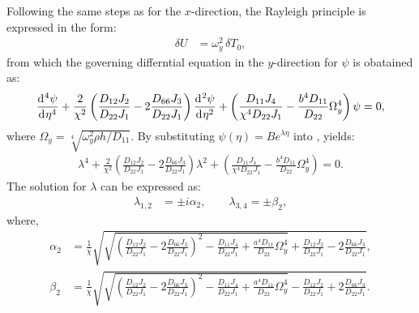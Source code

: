 \documentclass[preprint,12pt,number]{elsarticle}
\newcommand{\id}{\mathrm{d}\mkern1mu}
\begin{document}
Following the same steps as for the \(x\)-direction, the Rayleigh principle is expressed in the form:  
%
\begin{equation}\label{eq:Rayleighy}
	\begin{split}
		\delta U &= \omega_y^2 \, \delta T_0,
	\end{split}
\end{equation}
%
from which the governing differntial equation in the $y$-direction for $\psi$ is obatained as:
%
\begin{equation}\label{eq:ODEy}
	\frac{\id^4 \psi}{\id \eta^4} + \frac{2}{\chi^2}\left(\frac{D_{12}J_2}{D_{22}J_1} - 2\frac{D_{66}J_3}{D_{22}J_1}\right)\frac{\id^2 \psi}{\id \eta^2} + \left( \frac{D_{11}J_4}{\chi^4D_{22}J_1} - \frac{b^4D_{11}}{D_{22}} \Omega_y^4 \right) \psi = 0,
\end{equation}
%
where $\Omega_y = \sqrt[4]{{\omega_y^2 \rho h}/D_{11}}$.
By substituting $\psi(\eta) = B e^{\lambda \eta}$ into , yields:
%
\begin{equation}\label{eq:ODEy2}
\begin{split}
	\lambda^4 + \frac{2}{\chi^2} \left( \frac{D_{12}J_2}{D_{22}J_1} - 2\frac{D_{66}J_3}{D_{22}J_1} \right) \lambda^2 + \left( \frac{D_{11}J_4}{\chi^4D_{22}J_1} - \frac{b^4D_{11}}{D_{22}} \Omega_y^4 \right) = 0.
\end{split}
\end{equation}
%
The solution for $\lambda$ can be expressed as:
%
\begin{equation}\label{eq:lambda}
\begin{split}
	\lambda_{1,2} &= \pm \textit{i} \alpha_2, \qquad \lambda_{3,4} = \pm \beta_2,
\end{split}
\end{equation}
%
where,
%
\begin{subequations}\label{eq:beta}
\begin{align}
	\alpha_2 &= \frac{1}{\chi} \sqrt{ \sqrt{ \left( \frac{D_{12}J_2}{D_{22}J_1} - 2\frac{D_{66}J_3}{D_{22}J_1} \right)^2 - \frac{D_{11}J_4}{D_{22}J_1} + \frac{a^4 D_{11}}{D_{22}} \Omega_y^4 } + \frac{D_{12}J_2}{D_{22}J_1} - 2 \frac{D_{66}J_3}{D_{22}J_1}}, \label{eq:betay1}\\
	\beta_2 &= \frac{1}{\chi} \sqrt{ \sqrt{ \left( \frac{D_{12}J_2}{D_{22}J_1} - 2 \frac{D_{66}J_3}{D_{22}J_1} \right)^2 - \frac{D_{11}J_4}{D_{22}J_1} + \frac{a^4 D_{11}}{D_{22}} \Omega_y^4 } - \frac{D_{12}J_2}{D_{22}J_1} + 2 \frac{D_{66}J_3}{D_{22}J_1}}.\label{eq:betay2}
\end{align}
\end{subequations}
\end{document}
